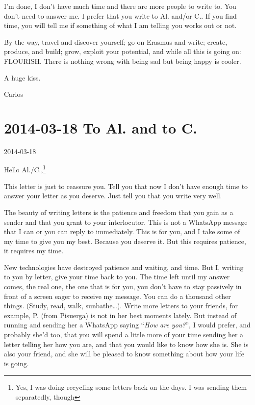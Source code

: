\documentclass[]{book}
\let\rmarkdownfootnote\footnote%
\def\footnote{\protect\rmarkdownfootnote}
\begin{document}
I'm done, I don't have much time and there are more people to write to. You don't need to answer me. I prefer that you write to Al. and/or C.. If you find time, you will tell me if something of what I am telling you works out or not.

By the way, travel and discover yourself; go on Erasmus and write; create, produce, and build; grow, exploit your potential, and while all this is going on: FLOURISH. There is nothing wrong with being sad but being happy is cooler.

A huge kiss.

Carlos

\hypertarget{toAlandC20140318}{%
\section*{2014-03-18 To Al. and to C.}\label{toAlandC20140318}}

2014-03-18

Hello Al./C.,\footnote{Yes, I was doing recycling some letters back on the days. I was sending them separatedly, though}

This letter is just to reassure you. Tell you that now I don't have enough time to answer your letter as you deserve. Just tell you that you write very well.

The beauty of writing letters is the patience and freedom that you gain as a sender and that you grant to your interlocutor. This is not a WhatsApp message that I can or you can reply to immediately. This is for you, and I take some of my time to give you my best. Because you deserve it. But this requires patience, it requires my time.

New technologies have destroyed patience and waiting, and time. But I, writing to you by letter, give your time back to you. The time left until my answer comes, the real one, the one that is for you, you don't have to stay passively in front of a screen eager to receive my message. You can do a thousand other things. (Study, read, walk, sunbathe\ldots). Write more letters to your friends, for example, P. (from Pisuerga) is not in her best moments lately. But instead of running and sending her a WhatsApp saying ``\emph{How are you?}'', I would prefer, and probably she'd too, that you will spend a little more of your time sending her a letter telling her how you are, and that you would like to know how she is. She is also your friend, and she will be pleased to know something about how your life is going.
\end{document}
